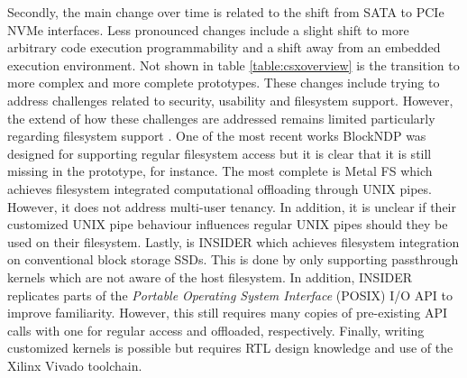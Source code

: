 Secondly, the main change over time is related to the shift from SATA to PCIe
NVMe interfaces. Less pronounced changes include a slight shift to more
arbitrary code execution programmability and a shift away from an embedded
execution environment. Not shown in table \ref{table:csxoverview} is the
transition to more complex and more complete prototypes. These changes include
trying to address challenges related to security, usability and filesystem
support. However, the extend of how these challenges are addressed remains
limited particularly regarding filesystem support \cite{barbalacecomputational}.
One of the most recent works BlockNDP \cite{10.1145/3429357.3430519} was
designed for supporting regular filesystem access but it is clear that it is
still missing in the prototype, for instance\footnotemark[4]. The most complete
is Metal FS \cite{10.1145/3342195.3387557} which achieves filesystem integrated
computational offloading through UNIX pipes. However, it does not address
multi-user tenancy. In addition, it is unclear if their customized UNIX pipe
behaviour influences regular UNIX pipes should they be used on their filesystem.
Lastly, is INSIDER \cite{234968} which achieves filesystem integration on
conventional block storage SSDs. This is done by only supporting passthrough
kernels which are not aware of the host filesystem. In addition, INSIDER
replicates parts of the \textit{Portable Operating System Interface} (POSIX) I/O
API to improve familiarity. However, this still requires many copies of
pre-existing API calls with one for regular access and offloaded, respectively.
Finally, writing customized kernels is possible but requires RTL design
knowledge and use of the Xilinx Vivado toolchain.


